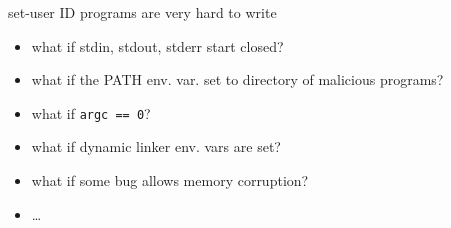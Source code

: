 \begin{frame}{set-user ID programs are very hard to write}
\begin{itemize}
\item what if stdin, stdout, stderr start closed?
\item what if the PATH env. var. set to directory of malicious programs?
\item what if \texttt{argc == 0}?
\item what if dynamic linker env. vars are set?
\item what if some bug allows memory corruption?
\item \ldots
\end{itemize}
\end{frame}
